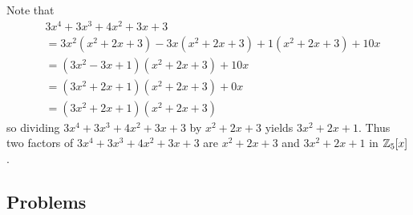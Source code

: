 \begin{questions}
    \item Note that
    \begin{align*}
        &3x^4 + 3x^3 + 4x^2 + 3x + 3\\
        &= 3x^2(x^2+2x+3) - 3x(x^2+2x+3) + 1(x^2+2x+3) + 10x\\
        &= (3x^2-3x+1)(x^2+2x+3) + 10x\\
        &= (3x^2+2x+1)(x^2+2x+3) + 0x\\
        &= (3x^2+2x+1)(x^2+2x+3)
    \end{align*}
    so dividing $3x^4 + 3x^3 + 4x^2 + 3x + 3$ by $x^2+2x+3$ yields $3x^2+2x+1$. Thus two factors of $3x^4 + 3x^3 + 4x^2 + 3x + 3$ are $x^2+2x+3$ and $3x^2+2x+1$ in $\mathbb{Z}_5[x]$.
\end{questions}

\subsection*{Problems}
